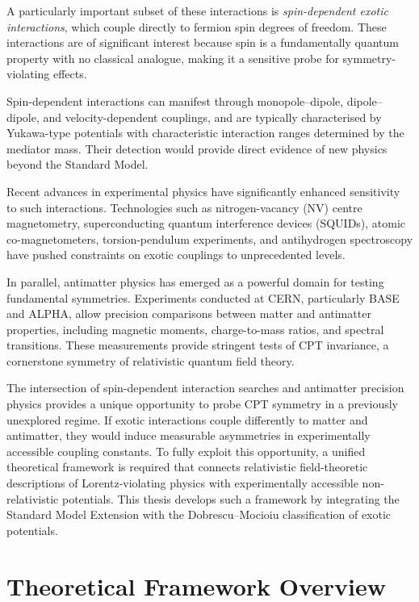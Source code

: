 \documentclass[12pt,a4paper]{report}
\begin{document}
A particularly important subset of these interactions is
\emph{spin-dependent exotic interactions}, which couple directly to fermion spin
degrees of freedom. These interactions are of significant interest because spin
is a fundamentally quantum property with no classical analogue, making it a
sensitive probe for symmetry-violating effects.

Spin-dependent interactions can manifest through monopole--dipole,
dipole--dipole, and velocity-dependent couplings, and are typically
characterised by Yukawa-type potentials with characteristic interaction ranges
determined by the mediator mass. Their detection would provide direct evidence
of new physics beyond the Standard Model.

Recent advances in experimental physics have significantly enhanced sensitivity
to such interactions. Technologies such as nitrogen-vacancy (NV) centre
magnetometry, superconducting quantum interference devices (SQUIDs), atomic
co-magnetometers, torsion-pendulum experiments, and antihydrogen spectroscopy
have pushed constraints on exotic couplings to unprecedented levels.

In parallel, antimatter physics has emerged as a powerful domain for testing
fundamental symmetries. Experiments conducted at CERN, particularly BASE and
ALPHA, allow precision comparisons between matter and antimatter properties,
including magnetic moments, charge-to-mass ratios, and spectral transitions.
These measurements provide stringent tests of CPT invariance, a cornerstone
symmetry of relativistic quantum field theory.

The intersection of spin-dependent interaction searches and antimatter precision
physics provides a unique opportunity to probe CPT symmetry in a previously
unexplored regime. If exotic interactions couple differently to matter and
antimatter, they would induce measurable asymmetries in experimentally
accessible coupling constants. To fully exploit this opportunity, a unified
theoretical framework is required that connects relativistic field-theoretic
descriptions of Lorentz-violating physics with experimentally accessible
non-relativistic potentials. This thesis develops such a framework by
integrating the Standard Model Extension with the Dobrescu--Mocioiu
classification of exotic potentials.

\section{Theoretical Framework Overview}
\end{document}
